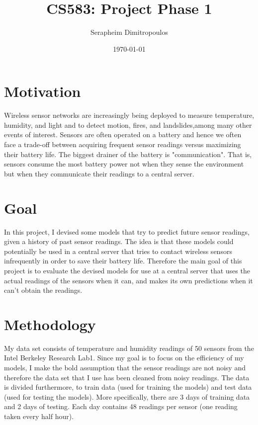 \documentclass{article}
\title{CS583: Project Phase 1}
\date{\today}
\author{Serapheim Dimitropoulos}
\begin{document}
\maketitle

\section{Motivation}

Wireless sensor networks are increasingly being deployed
to measure temperature, humidity, and light and to detect
motion, fires, and landslides,among many other events of
interest. Sensors are often operated on a battery and hence
we often face a trade-off between acquiring frequent sensor
readings versus maximizing their battery life. The biggest
drainer of the battery is "communication". That is, sensors
consume the most battery power not when they sense the
environment but when they communicate their readings to a
central server.

\section{Goal}

In this project, I devised some models that try to predict
future sensor readings, given a history of past sensor
readings. The idea is that these models could potentially
be used in a central server that tries to contact
wireless sensors infrequently in order to save their
battery life. Therefore the main goal of this project
is to evaluate the devised models for use at a central
server that uses the actual readings of the sensors when
it can, and makes its own predictions when it can't
obtain the readings.

\section{Methodology}

My data set consists of temperature and humidity readings
of 50 sensors from the Intel Berkeley Research Lab1. Since
my goal is to focus on the efficiency of my models, I make
the bold assumption that the sensor readings are not noisy
and therefore the data set that I use has been cleaned from
noisy readings. The data is divided furthermore, to train
data (used for training the models) and test data (used for
testing the models). More specifically, there are 3 days
of training data and 2 days of testing. Each day contains
48 readings per sensor (one reading taken every half hour).
\end{document}
